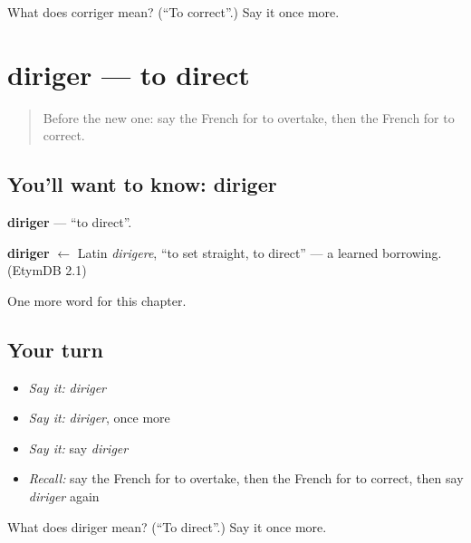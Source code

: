 \begin{tcolorbox}[breakable,colback=teal!4,colframe=teal!35!black,title={Before you move on}]
What does corriger mean? (\textquotedblleft{}To correct\textquotedblright{}.) Say it once more.
\end{tcolorbox}
\section[diriger]{diriger — to direct}

\label{lesson:FR-C182-diriger}



\begin{quote}
Before the new one: say the French for to overtake, then the French for to correct.
\end{quote}

\subsection*{You'll want to know: diriger}
\textbf{diriger} — \textquotedblleft{}to direct\textquotedblright{}.

\begin{cousinweb}
\textbf{diriger} $\leftarrow$ Latin \emph{dirigere}, \textquotedblleft{}to set straight, to direct\textquotedblright{} — a learned borrowing. (EtymDB 2.1)
\end{cousinweb}

\begin{grammarlens}[title={What you've built}]
One more word for this chapter.
\end{grammarlens}

\subsection*{Your turn}
\begin{itemize}
\raggedright
  \item \emph{Say it:} \emph{diriger}
  \item \emph{Say it:} \emph{diriger}, once more
  \item \emph{Say it:} say \emph{diriger}
  \item \emph{Recall:} say the French for to overtake, then the French for to correct, then say \emph{diriger} again
\end{itemize}

\begin{tcolorbox}[breakable,colback=teal!4,colframe=teal!35!black,title={Before you move on}]
What does diriger mean? (\textquotedblleft{}To direct\textquotedblright{}.) Say it once more.
\end{tcolorbox}
